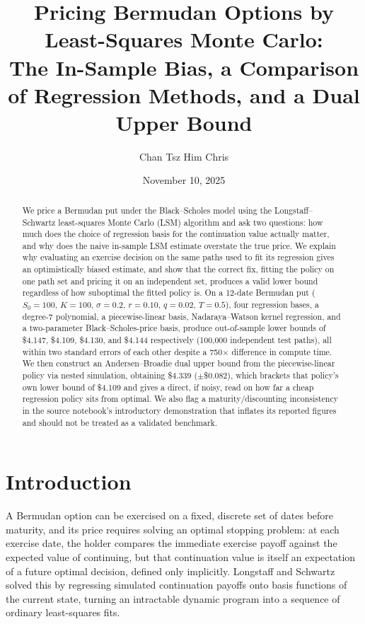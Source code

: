 \documentclass[11pt]{article}
\title{Pricing Bermudan Options by Least-Squares Monte Carlo:\\
The In-Sample Bias, a Comparison of Regression Methods, and a Dual Upper Bound}
\author{Chan Tsz Him Chris}
\date{November 10, 2025}
\begin{document}
\maketitle

\begin{abstract}
We price a Bermudan put under the Black--Scholes model using the Longstaff--Schwartz least-squares Monte Carlo (LSM) algorithm and ask two questions: how much does the choice of regression basis for the continuation value actually matter, and why does the naive in-sample LSM estimate overstate the true price. We explain why evaluating an exercise decision on the same paths used to fit its regression gives an optimistically biased estimate, and show that the correct fix, fitting the policy on one path set and pricing it on an independent set, produces a valid lower bound regardless of how suboptimal the fitted policy is. On a 12-date Bermudan put ($S_0=100$, $K=100$, $\sigma=0.2$, $r=0.10$, $q=0.02$, $T=0.5$), four regression bases, a degree-7 polynomial, a piecewise-linear basis, Nadaraya--Watson kernel regression, and a two-parameter Black--Scholes-price basis, produce out-of-sample lower bounds of \$4.147, \$4.109, \$4.130, and \$4.144 respectively (100{,}000 independent test paths), all within two standard errors of each other despite a 750$\times$ difference in compute time. We then construct an Andersen--Broadie dual upper bound from the piecewise-linear policy via nested simulation, obtaining \$4.339 ($\pm$\$0.082), which brackets that policy's own lower bound of \$4.109 and gives a direct, if noisy, read on how far a cheap regression policy sits from optimal. We also flag a maturity/discounting inconsistency in the source notebook's introductory demonstration that inflates its reported figures and should not be treated as a validated benchmark.
\end{abstract}

\section{Introduction}

A Bermudan option can be exercised on a fixed, discrete set of dates before maturity, and its price requires solving an optimal stopping problem: at each exercise date, the holder compares the immediate exercise payoff against the expected value of continuing, but that continuation value is itself an expectation of a future optimal decision, defined only implicitly. Longstaff and Schwartz \cite{longstaffschwartz2001} solved this by regressing simulated continuation payoffs onto basis functions of the current state, turning an intractable dynamic program into a sequence of ordinary least-squares fits.
\end{document}
